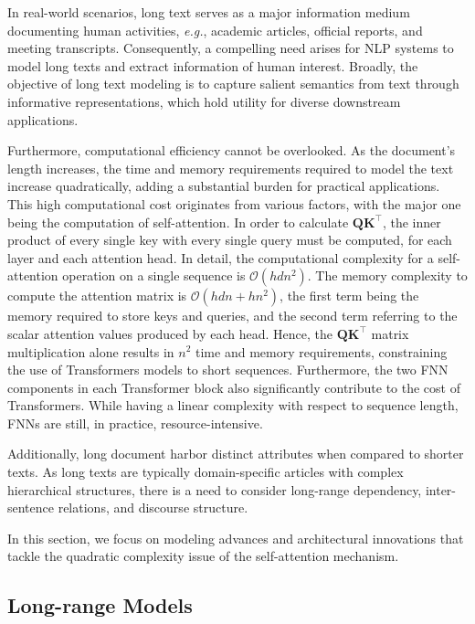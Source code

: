 
In real-world scenarios, long text serves as a major information medium documenting human activities, \textit{e.g.}, academic articles, official reports, and meeting transcripts. Consequently, a compelling need arises for \ac{NLP} systems to model long texts and extract information of human interest. Broadly, the objective of long text modeling is to capture salient semantics from text through informative representations, which hold utility for diverse downstream applications.
 
Furthermore, computational efficiency cannot be overlooked. As the document's length increases, the time and memory requirements required to model the text increase quadratically, adding a substantial burden for practical applications. This high computational cost originates from various factors, with the major one being the computation of self-attention. In order to calculate $\bm{Q}\bm{K}^{\top}$, the inner product of every single key with every single query must be computed, for each layer and each attention head.  In detail, the computational complexity for a self-attention operation on a single sequence is $\mathcal{O}(hdn^2)$. The memory complexity to compute the attention matrix is $\mathcal{O}(hdn + hn^2)$, the first term being the memory required to store keys and queries, and the second term referring to the scalar attention values produced by each head. Hence, the $\bm{Q}\bm{K}^{\top}$ matrix multiplication alone results in $n^2$ time and memory requirements, constraining the use of Transformers models to short sequences. Furthermore, the two \ac{FNN} components in each Transformer block also significantly contribute to the cost of Transformers. While having a linear complexity with respect to sequence length, \acp{FNN} are still, in practice, resource-intensive.

Additionally, long document harbor distinct attributes when compared to shorter texts. As long texts are typically domain-specific articles with complex hierarchical structures, there is a need to consider long-range dependency, inter-sentence relations, and discourse structure.

In this section, we focus on modeling advances and architectural innovations that tackle the quadratic complexity issue of the self-attention mechanism.

\subsection{Long-range Models}

